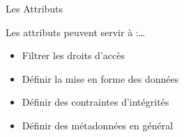\begin{frame}{Les Attributs}

  Les attributs peuvent servir à :\dots
  \begin{itemize}
  \item Filtrer les droits d'accès
  \item Définir la mise en forme des données
\item Définir des contraintes d'intégrités
\item Définir des métadonnées en général
  \end{itemize}
\end{frame}